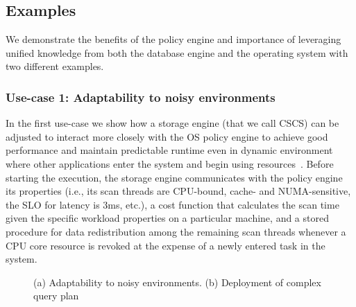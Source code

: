 \documentclass[11pt]{article}
\begin{document}
\subsection*{Examples}
We demonstrate the benefits of the policy engine and importance of leveraging unified knowledge
from both the database engine and the operating system with two different examples.

\subsubsection*{Use-case 1: Adaptability to noisy environments}
In the first use-case we show how a storage engine (that we call CSCS) can be adjusted to 
interact more closely 
with the OS policy engine to achieve good performance and maintain predictable runtime even
in dynamic environment where other applications enter the system and begin using 
resources~\cite{cod:2013}.
Before starting the execution, the storage engine communicates with the policy engine its 
properties (i.e., its scan threads are CPU-bound, cache- and NUMA-sensitive, the SLO 
for latency is 3ms, etc.), a cost 
function that calculates the scan time given the specific workload properties on a 
particular machine, and a stored procedure for data redistribution among the remaining 
scan threads whenever a CPU core resource is revoked at the expense of a newly entered 
task in the system.

\begin{figure}
\centering	
{}
\hfill
{}
\caption{(a) Adaptability to noisy environments. (b) Deployment of complex query plan}
\end{figure}
\end{document}
